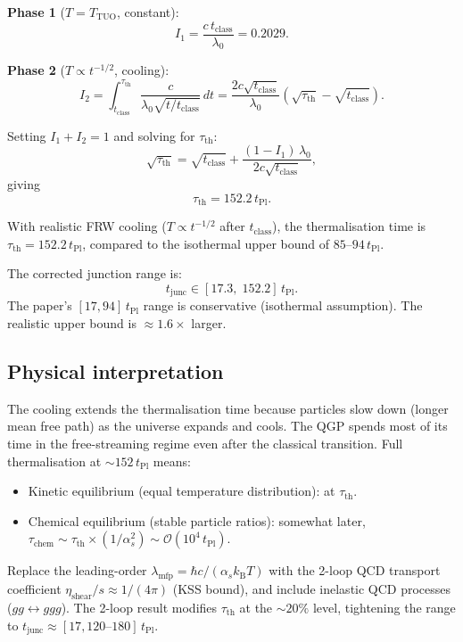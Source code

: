 \documentclass[12pt,a4paper]{article}
\theoremstyle{remark}
\newcommand{\tPl}{t_{\mathrm{Pl}}}
\newcommand{\kB}{k_{\mathrm{B}}}
\newcommand{\TTUO}{T_{\mathrm{TUO}}}
\newcommand{\junc}{t_{\mathrm{junc}}}
\begin{document}
\textbf{Phase 1} ($T = \TTUO$, constant):
\[
  I_1 = \frac{c\,t_\mathrm{class}}{\lambda_0} = 0.2029.
\]

\textbf{Phase 2} ($T \propto t^{-1/2}$, cooling):
\[
  I_2 = \int_{t_\mathrm{class}}^{\tau_\mathrm{th}}
  \frac{c}{\lambda_0\sqrt{t/t_\mathrm{class}}}\,dt
  = \frac{2c\sqrt{t_\mathrm{class}}}{\lambda_0}
    \!\left(\sqrt{\tau_\mathrm{th}} - \sqrt{t_\mathrm{class}}\right).
\]

Setting $I_1 + I_2 = 1$ and solving for $\tau_\mathrm{th}$:
\[
  \sqrt{\tau_\mathrm{th}}
  = \sqrt{t_\mathrm{class}}
  + \frac{(1 - I_1)\,\lambda_0}{2c\sqrt{t_\mathrm{class}}},
\]
giving
\begin{equation}\label{eq:tau_th_new}
  \boxed{\tau_\mathrm{th} = 152.2\,\tPl.}
\end{equation}

\begin{tcolorbox}[findingbox,title={New result (OP4)}]
With realistic FRW cooling ($T \propto t^{-1/2}$ after $t_\mathrm{class}$),
the thermalisation time is $\tau_\mathrm{th} = 152.2\,\tPl$,
compared to the isothermal upper bound of $85\text{--}94\,\tPl$.

The corrected junction range is:
\[
  \junc \in [17.3,\; 152.2]\,\tPl.
\]
The paper's $[17, 94]\,\tPl$ range is conservative (isothermal assumption).
The realistic upper bound is $\approx 1.6\times$ larger.
\end{tcolorbox}

\subsection{Physical interpretation}

The cooling extends the thermalisation time because particles slow
down (longer mean free path) as the universe expands and cools.
The QGP spends most of its time in the free-streaming regime even
after the classical transition.
Full thermalisation at $\sim152\,\tPl$ means:
\begin{itemize}
  \item Kinetic equilibrium (equal temperature distribution): at $\tau_\mathrm{th}$.
  \item Chemical equilibrium (stable particle ratios): somewhat later,
    $\tau_\mathrm{chem} \sim \tau_\mathrm{th} \times (1/\alpha_s^2) \sim \mathcal{O}(10^4\,\tPl)$.
\end{itemize}

\begin{tcolorbox}[openbox,title={What closes OP4 fully}]
Replace the leading-order $\lambda_\mathrm{mfp} = \hbar c/(\alpha_s\kB T)$
with the 2-loop QCD transport coefficient
$\eta_\mathrm{shear}/s \approx 1/(4\pi)$ (KSS bound), and include
inelastic QCD processes ($gg\leftrightarrow ggg$).
The 2-loop result modifies $\tau_\mathrm{th}$ at the $\sim20\%$ level,
tightening the range to $\junc \approx [17, 120\text{--}180]\,\tPl$.
\end{tcolorbox}
\end{document}
